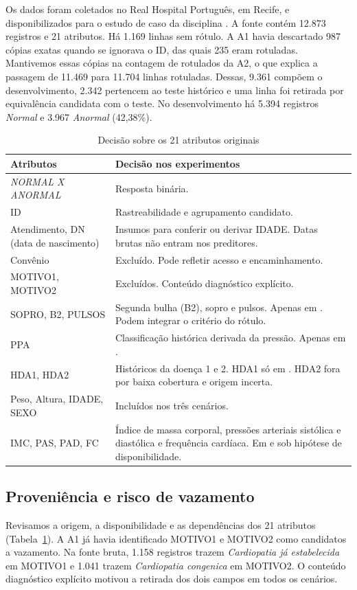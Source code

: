 Os dados foram coletados no Real Hospital Português, em Recife, e disponibilizados para o estudo de caso da disciplina \cite{tema}. A fonte contém 12.873 registros e 21 atributos. Há 1.169 linhas sem rótulo. A A1 havia descartado 987 cópias exatas quando se ignorava o ID, das quais 235 eram rotuladas. Mantivemos essas cópias na contagem de rotulados da A2, o que explica a passagem de 11.469 para 11.704 linhas rotuladas. Dessas, 9.361 compõem o desenvolvimento, 2.342 pertencem ao teste histórico e uma linha foi retirada por equivalência candidata com o teste. No desenvolvimento há 5.394 registros \textit{Normal} e 3.967 \textit{Anormal} (42,38\%).

\begin{table}[!htbp]
\centering
\caption{Decisão sobre os 21 atributos originais}
\label{tab:policy}
\footnotesize
\begin{tabular}{@{}p{}p{}@{}}
\toprule
Atributos & Decisão nos experimentos \\
\midrule
\textit{NORMAL X ANORMAL} & Resposta binária. \\
ID & Rastreabilidade e agrupamento candidato. \\
Atendimento, DN (data de nascimento) & Insumos para conferir ou derivar IDADE. Datas brutas não entram nos preditores. \\
Convênio & Excluído. Pode refletir acesso e encaminhamento. \\
MOTIVO1, MOTIVO2 & Excluídos. Conteúdo diagnóstico explícito. \\
SOPRO, B2, PULSOS & Segunda bulha (B2), sopro e pulsos. Apenas em \clin{}. Podem integrar o critério do rótulo. \\
PPA & Classificação histórica derivada da pressão. Apenas em \clin{}. \\
HDA1, HDA2 & Históricos da doença 1 e 2. HDA1 só em \clin{}. HDA2 fora por baixa cobertura e origem incerta. \\
Peso, Altura, IDADE, SEXO & Incluídos nos três cenários. \\
IMC, PAS, PAD, FC & Índice de massa corporal, pressões arteriais sistólica e diastólica e frequência cardíaca. Em \fisio{} e \clin{} sob hipótese de disponibilidade. \\
\bottomrule
\end{tabular}
\end{table}

\subsection{Proveniência e risco de vazamento}
Revisamos a origem, a disponibilidade e as dependências dos 21 atributos (Tabela~\ref{tab:policy}). A A1 já havia identificado MOTIVO1 e MOTIVO2 como candidatos a vazamento. Na fonte bruta, 1.158 registros trazem \textit{Cardiopatia já estabelecida} em MOTIVO1 e 1.041 trazem \textit{Cardiopatia congenica} em MOTIVO2. O conteúdo diagnóstico explícito motivou a retirada dos dois campos em todos os cenários.


